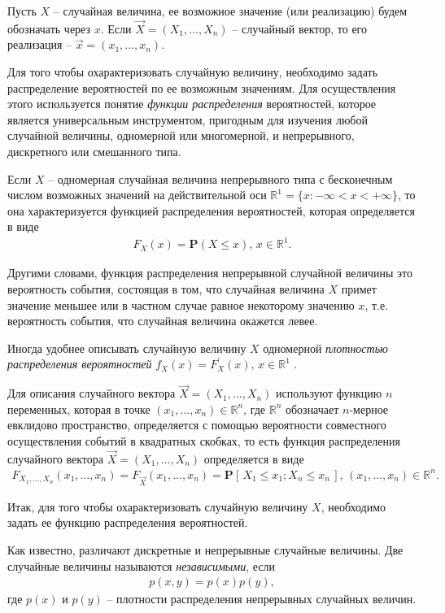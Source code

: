 \documentclass[%
	11pt,
	a4paper,
	utf8,
		]{article}
\begin{document}
Пусть $ X $ -- случайная величина, ее возможное значение (или реализацию) будем обозначать через $ x $. Если $ \vec{X} = (X_1, \dots, X_n) $ -- случайный вектор, то его реализация -- $ \vec{x} = (x_1, \dots, x_n) $.

Для того чтобы охарактеризовать случайную величину, необходимо задать распределение вероятностей по ее возможным значениям. Для осуществления этого используется понятие \emph{функции распределения} вероятностей, которое является универсальным инструментом, пригодным для изучения любой случайной величины, одномерной или многомерной, и непрерывного, дискретного или смешанного типа.

Если $ X $ -- одномерная случайная величина непрерывного типа с бесконечным числом возможных значений на действительной оси $ \mathbb{R}^1 = \{x: -\infty < x < +\infty\} $, то она характеризуется функцией распределения вероятностей, которая определяется в виде
\begin{align*}
	F_X(x) = \mathbf{P}(X \leqslant x), \, x \in \mathbb{R}^1.
\end{align*}

Другими словами, функция распределения непрерывной случайной величины это вероятность события, состоящая в том, что случайная величина $ X $ примет значение меньшее или в частном случае равное некоторому значению $ x $, т.е. вероятность события, что случайная величина окажется левее.

Иногда удобнее описывать случайную величину $ X $ одномерной \emph{плотностью распределения вероятностей} $ f_X(x) = F_X^{'}(x), \, x \in \mathbb{R}^1 $ .

Для описания случайного вектора $ \vec{X} = (X_1, \dots, X_n) $ используют функцию $ n $ переменных, которая в точке $ (x_1, \dots, x_n) \in \mathbb{R}^n $, где $ \mathbb{R}^n $ обозначает $ n $-мерное евклидово пространство, определяется с помощью вероятности совместного осуществления событий в квадратных скобках, то есть функция распределения случайного вектора $ \vec{X} = (X_1, \dots, X_n) $ определяется в виде
\begin{align*}
	F_{X_1, \dots, X_n}(x_1, \dots, x_n) = F_{\vec{X}}(x_1, \dots, x_n) = \mathbf{P}[\,X_1 \leqslant x_1; X_n \leqslant x_n\,], \, (x_1, \dots, x_n) \in \mathbb{R}^n.
\end{align*}

Итак, для того чтобы охарактеризовать случайную величину $ X $, необходимо задать ее функцию распределения вероятностей.

Как известно, различают дискретные и непрерывные случайные величины. Две случайные величины называются \emph{независимыми}, если
\begin{align*}
	p(x,y) = p(x)p(y),
\end{align*}
где $ p(x) $ и $ p(y) $ -- плотности распределения непрерывных случайных величин.
\end{document}
